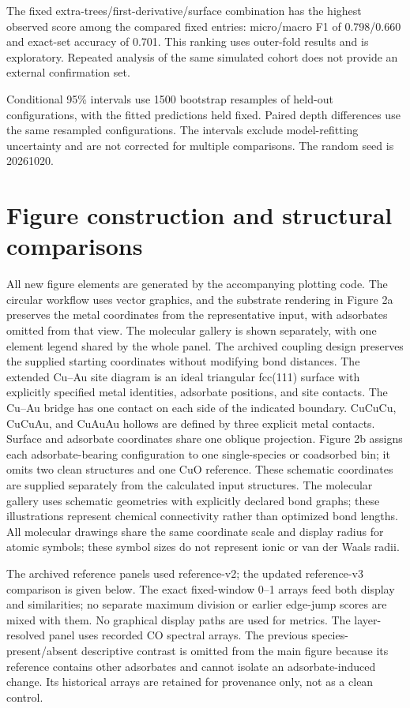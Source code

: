 \documentclass[11pt,a4paper]{article}
\begin{document}


The fixed extra-trees/first-derivative/surface combination has the highest observed score among the compared fixed entries: micro/macro F1 of 0.798/0.660 and exact-set accuracy of 0.701. This ranking uses outer-fold results and is exploratory. Repeated analysis of the same simulated cohort does not provide an external confirmation set.

Conditional 95\% intervals use 1500 bootstrap resamples of held-out configurations, with the fitted predictions held fixed. Paired depth differences use the same resampled configurations. The intervals exclude model-refitting uncertainty and are not corrected for multiple comparisons. The random seed is 20261020.

\section{Figure construction and structural comparisons}
All new figure elements are generated by the accompanying plotting code. The circular workflow uses vector graphics, and the substrate rendering in Figure 2a preserves the metal coordinates from the representative input, with adsorbates omitted from that view. The molecular gallery is shown separately, with one element legend shared by the whole panel. The archived coupling design preserves the supplied starting coordinates without modifying bond distances. The extended Cu--Au site diagram is an ideal triangular fcc(111) surface with explicitly specified metal identities, adsorbate positions, and site contacts. The Cu--Au bridge has one contact on each side of the indicated boundary. CuCuCu, CuCuAu, and CuAuAu hollows are defined by three explicit metal contacts. Surface and adsorbate coordinates share one oblique projection. Figure 2b assigns each adsorbate-bearing configuration to one single-species or coadsorbed bin; it omits two clean structures and one CuO reference. These schematic coordinates are supplied separately from the calculated input structures. The molecular gallery uses schematic geometries with explicitly declared bond graphs; these illustrations represent chemical connectivity rather than optimized bond lengths. All molecular drawings share the same coordinate scale and display radius for atomic symbols; these symbol sizes do not represent ionic or van der Waals radii.

The archived reference panels used reference-v2; the updated reference-v3 comparison is given below. The exact fixed-window 0--1 arrays feed both display and similarities; no separate maximum division or earlier edge-jump scores are mixed with them. No graphical display paths are used for metrics. The layer-resolved panel uses recorded CO spectral arrays. The previous species-present/absent descriptive contrast is omitted from the main figure because its reference contains other adsorbates and cannot isolate an adsorbate-induced change. Its historical arrays are retained for provenance only, not as a clean control.
\end{document}
